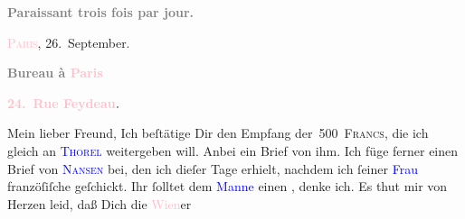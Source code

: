            \pstart
           \begin{otherlanguage}{french}\textcolor{gray}{\textbf{\textbf{Paraissant trois fois par jour.}}}\end{otherlanguage}\hfill \textsc{\textcolor{pink}{Paris}{}\ledrightnote{\textcolor{pink}{Paris}}}, 26. September.\pend
           \pstart
           \begin{otherlanguage}{french}\textcolor{gray}{\textbf{\textbf{Bureau à \textcolor{pink}{Paris}{}\ledrightnote{\textcolor{pink}{Paris}}}}}\end{otherlanguage}\pend
           \pstart
           \begin{otherlanguage}{french}\textcolor{gray}{\textbf{\textbf{\textcolor{pink}{24. Rue Feydeau}{}\ledrightnote{\textcolor{pink}{rue Feydeau}}.}}}\end{otherlanguage}\pend
           \pstart\center{}Mein lieber Freund,\pend\pstart
            Ich beſtätige Dir den Empfang der 500 \textsc{Francs}, die ich
               gleich an \textsc{\textcolor{blue}{Thorel}{}\ledrightnote{\textcolor{blue}{Jean Thorel}}} weitergeben will. Anbei ein Brief von ihm.\pend
           \pstart
           Ich füge ferner einen Brief von \textsc{\textcolor{blue}{Nansen}{}\ledrightnote{\textcolor{blue}{Peter Nansen}}{ }} bei, den ich dieſer Tage erhielt, nachdem ich ſeiner \textcolor{blue}{Frau}{} franzöſiſche \label{K_L02786-2v}\label{K_L02786-2h} geſchickt.
               Ihr ſolltet dem \textcolor{blue}{Manne}{} einen
                  \label{K_L02786-3v}\label{K_L02786-3h}, denke ich.\pend
           \pstart
           Es thut mir von Herzen leid, daß Dich die \textcolor{pink}{Wien}{}\ledrightnote{\textcolor{pink}{Wien}}er
